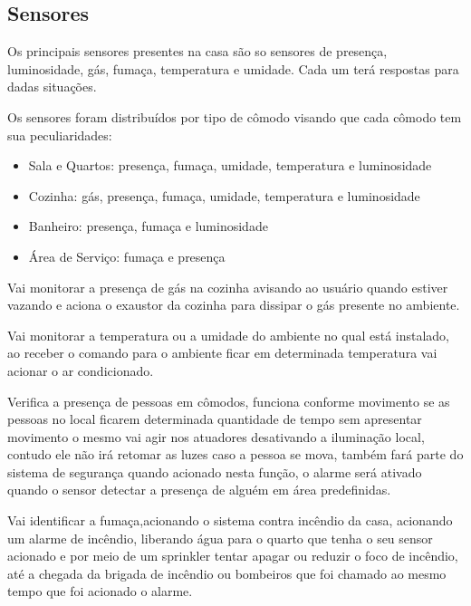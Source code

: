 	       \subsection{Sensores}
	            \par Os principais sensores presentes na casa são so sensores de presença, luminosidade, gás, fumaça, temperatura e umidade. Cada um terá respostas para dadas situações.
	            \par Os sensores foram distribuídos por tipo de cômodo visando que cada cômodo tem sua peculiaridades:
	            \begin{itemize}
	                \item Sala e Quartos: presença, fumaça, umidade, temperatura e luminosidade
                    \item Cozinha: gás, presença, fumaça, umidade, temperatura e luminosidade
                    \item Banheiro: presença, fumaça e luminosidade
                    \item Área de Serviço: fumaça e presença
	            \end{itemize}
	                \par Vai monitorar a presença de gás na cozinha avisando ao usuário quando estiver vazando e aciona o exaustor da cozinha para dissipar o gás presente no ambiente.
	                \par Vai monitorar a temperatura ou a umidade do ambiente no qual está instalado, ao receber o comando para o ambiente ficar em determinada temperatura vai acionar o ar condicionado.
	                \par Verifica a presença de pessoas em cômodos, funciona conforme movimento se as pessoas no local ficarem determinada quantidade de tempo sem apresentar movimento o mesmo vai agir nos atuadores desativando a iluminação local, contudo ele não irá retomar as luzes caso a pessoa se mova, também fará parte do sistema de segurança quando acionado nesta função, o alarme será ativado quando o sensor detectar a presença de alguém em área predefinidas.
	                \par Vai identificar a fumaça,acionando o sistema contra incêndio da casa, acionando um alarme de incêndio, liberando água para o quarto que tenha o seu sensor acionado e por meio de um sprinkler tentar apagar ou reduzir o foco de incêndio, até a chegada da brigada de incêndio ou bombeiros que foi chamado ao mesmo tempo que foi acionado o alarme.

